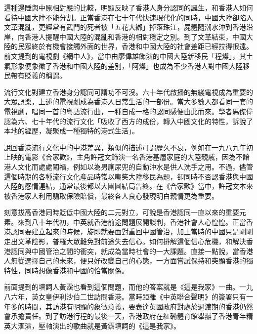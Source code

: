 這種邊陲與中原相對應的比較，明顯反映了香港人身分認同的誕生，和香港人如何看待中國大陸不能分割。正當香港在七十年代快速現代化的同時，中國大陸卻陷入文革混亂，更經常有武鬥的死者被「五花大綁」掉落珠江，屍體隨潮水沖到香港沿岸，向香港人提醒中國大陸的混亂和香港的相對穩定之別。到了文革結束，中國大陸的民眾終於有機會接觸外面的世界，香港和中國大陸的社會差距已經拉得很遠。前文提到的電視劇《網中人》，當中由廖偉雄飾演的中國大陸新移民「程燦」，其土氣形象便象徵了香港和中國大陸的差別，「阿燦」也成為不少香港人對中國大陸移民帶有貶義的稱謂。

流行文化對建立香港身分認同可謂功不可沒。六十年代啟播的無綫電視成為重要的大眾誤樂，上述的電視劇成為香港人日常生活的一部份。當大多數人都看同一套的電視劇，唱同一首的粵語流行曲，一種自成一格的認同感便由此而來。學者馬傑偉認為六、七十年代的流行文化「吸收了西方的成份，轉入中國文化的特性，訴說了本地的經歷，凝聚成一種獨特的港式生活」。

說回香港流行文化中的中港差異，類似的描述可謂歷久不衰，例如在一九八九年初上映的電影《合家歡》，主角許冠文飾演一名香港基層家庭的大陸親戚，因為不諳港人文化而處處闖禍，例如以為男廁尿兜的自動沖水是供人洗手之用。不過，儘管這個時期的各種流行文化產品時常以嘲笑大陸移民為題，卻同時不否認香港與中國大陸的感情連結，通常最後都以大團圓結局告終。在《合家歡》當中，許冠文本來被香港家人利用騙取保險賠償，最終各人良心發現明白親情更為重要。

刻意拔高香港同時貶低中國大陸的二元對立，可說是香港認同一直以來的重要元素。來到八十年代初，中英就香港前途問題展開談判，香港社會人心惶惶。正當香港認同要建立起來的時候，旋即就要面對重回中國管治，加上當時的中國只是剛剛走出文革陰影，普羅大眾難免對前途失去信心。如何排解這個信心危機，和解決香港認同與中國管治之間的衝突，就成為當時社會的一大課題。直接一點說，當香港人無從選擇自己的未來，便只好改變自己的心態，一方面嘗試保持和突顯香港的獨特性，同時想像香港和中國的恰當關係。

前面提到的填詞人黃霑也看到這個問題，而他的答案就是《這是我家》一曲。一九八六年，英女皇伊利沙伯二世訪問香港。當時距離《中英聯合聲明》的簽署只有一年多的時間，其訪港有明顯的象徵意義，要表達英國政府對處於過渡期的香港仍然會承擔責任。到了訪港行程的最後一天，香港政府在紅磡體育館舉辦了香港青年精英大滙演，壓軸演出的歌曲就是黃霑填詞的《這是我家》。



